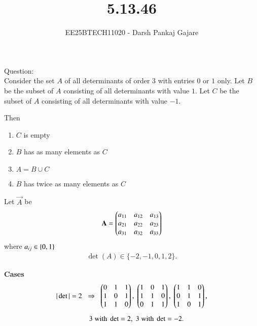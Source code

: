 \documentclass[journal,12pt,onecolumn]{IEEEtran}
\begin{document}
\title{5.13.46}
\author{EE25BTECH11020 - Darsh Pankaj Gajare}
{\let\newpage\relax\maketitle}
Question:\\Consider the set $A$ of all determinants of order $3$ with entries $0$ or $1$ only. Let $B$ be the subset of $A$ consisting of all determinants with value $1$. Let $C$ be the subset of $A$ consisting of all determinants with value $-1$. 

Then

\begin{multicols}{2}
\begin{enumerate}
    \item $C$ is empty
    \item $B$ has as many elements as $C$
    \item $A = B \cup C$
    \item $B$ has twice as many elements as $C$
\end{enumerate}
\end{multicols}
\solution

Let $\vec{A}$ be
\begin{align}
	\mathbf{A}=\begin{pmatrix}a_{11}&a_{12}&a_{13}\\a_{21}&a_{22}&a_{23}\\a_{31}&a_{32}&a_{33}\end{pmatrix}
\end{align}
where $a_{ij}\in \left\{0,1\right\}$ 
\begin{align}
\det(A)\in\{-2,-1,0,1,2\}.
\end{align}


\textbf{ Cases}
\begin{align}
|\det|=2 &\;\;\Rightarrow\;\;
\begin{pmatrix}0&1&1\\1&0&1\\1&1&0\end{pmatrix},\;
\begin{pmatrix}1&0&1\\1&1&0\\0&1&1\end{pmatrix},\;
\begin{pmatrix}1&1&0\\0&1&1\\1&0&1\end{pmatrix}, \\[1ex]
&\quad 3 \;\text{with } \det=2,\;
3 \;\text{with } \det=-2.
\end{align}
\end{document}
